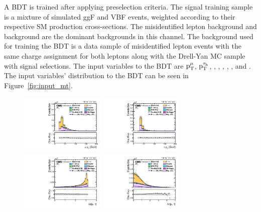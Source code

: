 A BDT is trained after applying preselection criteria. The signal training sample is a mixture of simulated ggF and VBF events, weighted according to their respective SM production cross-sections. The misidentified lepton background and \Ztt background are the dominant backgrounds in this channel. The background used for training the BDT is a data sample of misidentified lepton events with the same charge assignment for both leptons along with the Drell-Yan MC sample with signal selections. The input variables to the BDT are $\text{p}_\text{T}^{\mu}$, $\text{p}_\text{T}^{\tau_{\text{h}}}$, \mcol, \ptvecmiss, \mttmet, \detamtauh, \dphimtauh, and \dphitauhmet. The input variables' distribution to the BDT can be seen in Figure~\ref{fig:input_mt}.

\begin{figure}[htbp!]
  \centering
  \includegraphics[width=0.36\textwidth]{plots/chapter6/mutau/mPt.pdf}
  \includegraphics[width=0.36\textwidth]{plots/chapter6/mutau/tPt.pdf}\\
  \includegraphics[width=0.36\textwidth]{plots/chapter6/mutau/dPhiMuTau.pdf}
  \includegraphics[width=0.36\textwidth]{plots/chapter6/mutau/dEtaMuTau.pdf}\\

\end{figure}
